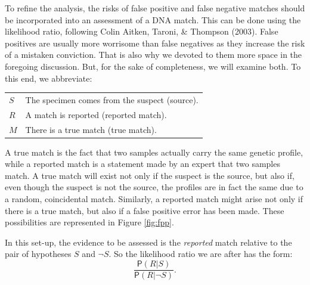 \documentclass[
  10pt,
  dvipsnames,enabledeprecatedfontcommands]{scrartcl}
\newcommand{\pr}[1]{\mathsf{P}(#1)}
\begin{document}
To refine the analysis, the risks of false positive and false negative
matches should be incorporated into an assessment of a DNA match. This
can be done using the likelihood ratio, following Colin Aitken, Taroni,
\& Thompson (2003). False positives are usually more worrisome than
false negatives as they increase the risk of a mistaken conviction. That
is also why we devoted to them more space in the foregoing discussion.
But, for the sake of completeness, we will examine both. To this end, we
abbreviate:

\begin{center} \hspace{10mm}
\begin{tabular}{lp{9cm}}
$S$ & The specimen comes from the suspect (source). \\
$R$ & A match is reported (reported match). \\
$M$ & There is a true match (true match).
\end{tabular}
\end{center}

\noindent A true match is the fact that two samples actually carry the
same genetic profile, while a reported match is a statement made by an
expert that two samples match. A true match will exist not only if the
suspect is the source, but also if, even though the suspect is not the
source, the profiles are in fact the same due to a random, coincidental
match. Similarly, a reported match might arise not only if there is a
true match, but also if a false positive error has been made. These
possibilities are represented in Figure \ref{fig:fpp}.

In this set-up, the evidence to be assessed is the \textit{reported}
match relative to the pair of hypotheses \(S\) and \(\neg S\). So the
likelihood ratio we are after has the form:
\[\frac{\pr{R \vert S}}{\pr{R \vert \neg S}}.\]
\end{document}
